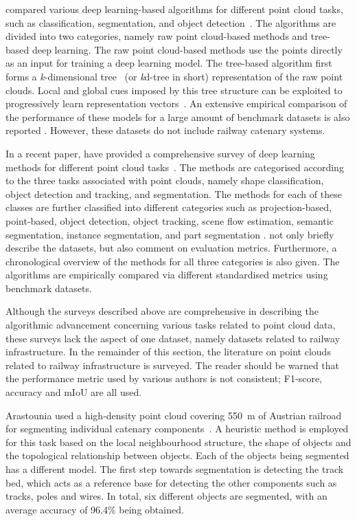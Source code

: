 \citeauthor{liu19deep} compared various deep learning-based algorithms for different point cloud tasks, such as classification, segmentation, and object detection~\cite{liu19deep}. The algorithms are divided into two categories, namely raw point cloud-based methods and tree-based deep learning. The raw point cloud-based methods use the points directly as an input for training a deep learning model. The tree-based algorithm first forms a \textit{k}-dimensional tree~\cite{bentley1975multidimensional} (or \textit{k}d-tree in short) representation of the raw point clouds. Local and global cues imposed by this tree structure can be exploited to progressively learn representation vectors~\cite{zeng20183dcontextnet}. An extensive empirical comparison of the performance of these models for a large amount of benchmark datasets is also reported \cite{liu19deep}. However, these datasets do not include railway catenary systems. 

In a recent paper, \citeauthor{guo2020deep} have provided a comprehensive survey of deep learning methods for different point cloud tasks~\cite{guo2020deep}. The methods are categorised according to the three tasks associated with point clouds, namely shape classification, object detection and tracking, and segmentation. The methods for each of these classes are further classified into different categories such as projection-based, point-based, object detection, object tracking, scene flow estimation, semantic segmentation, instance segmentation, and part segmentation \cite[Fig.~1.]{guo2020deep}. \citeauthor{guo2020deep} not only briefly describe the datasets, but also comment on evaluation metrics. Furthermore, a chronological overview of the methods for all three categories is also given. The algorithms are empirically compared via different standardised metrics using benchmark datasets.

Although the surveys described above are comprehensive in describing the algorithmic advancement concerning various tasks related to point cloud data, these surveys lack the aspect of one dataset, namely datasets related to railway infrastructure. In the remainder of this section, the literature on point clouds related to railway infrastructure is surveyed. The reader should be warned that the performance metric used by various authors is not consistent; F1-score, accuracy and mIoU are all used.

Arastounia used a high-density point cloud covering 550~m of Austrian railroad for segmenting individual catenary components~\cite{arastounia2015automated}. A heuristic method is employed for this task based on the local neighbourhood structure, the shape of objects and the topological relationship between objects. Each of the objects being segmented has a different model. The first step towards segmentation is detecting the track bed, which acts as a reference base for detecting the other components such as tracks, poles and wires. In total, six different objects are segmented, with an average accuracy of 96.4\% being obtained.

